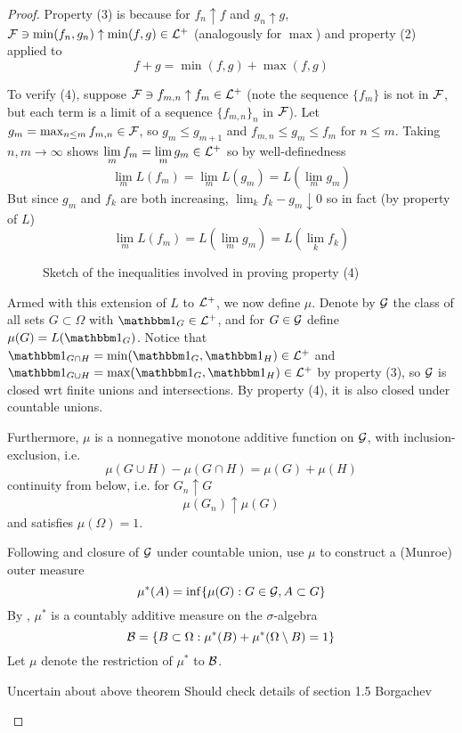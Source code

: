 \begin{proof}
  Property (3) is because for $f_n \uparrow f$ and $g_n \uparrow g$,
  $\mathcal{F} \ni \min(f_n, g_n) \uparrow \min(f,g) \in \mathcal{L}^+$
  (analogously for $\max$)
  and property (2) applied to
  \[
    f+g = \min(f,g) + \max(f,g)
  \]

  To verify (4), suppose $\mathcal{F} \ni f_{m,n} \uparrow f_m \in \mathcal{L}^+$
  (note the sequence $\{f_m\}$ is not in $\mathcal{F}$, but each term is a limit
  of a sequence $\{f_{m,n}\}_n$ in $\mathcal{F}$).
  Let $g_m = \max_{n \leq m} f_{m,n} \in \mathcal{F}$, so
  $g_m \leq g_{m+1}$ and $f_{m,n} \leq g_m \leq f_m$ for $n \leq m$.
  Taking $n,m \to \infty$ shows $\lim_m f_m = \lim_m g_m \in \cL^+$
  so by well-definedness
  \[
    \lim_m L(f_m) = \lim_m L(g_m) = L(\lim_m g_m)
  \]
  But since $g_m$ and $f_k$ are both increasing, $\lim_k f_k - g_m \downarrow
  0$ so in fact (by property of $L$)
  \[
    \lim_m L(f_m) = L(\lim_m g_m) = L(\lim_k f_k)
  \]

  \begin{figure}[H]
    \centering
    \caption{Sketch of the inequalities involved in proving property (4)}
    \label{fig:sketch-of-proof-of-4}
  \end{figure}

  Armed with this extension of $L$ to $\mathcal{L}^+$, we now define $\mu$.
  Denote by $\mathcal{G}$ the class of all sets $G \subset \Omega$ with
  $\ind_{G} \in \cL^+$,
  and for $G \in \mathcal{G}$ define $\mu(G) = L(\ind_{G})$.
  Notice that $\ind_{G \cap H} = \min(\ind_G, \ind_H) \in \cL^+$
  and $\ind_{G \cup H} = \max(\ind_G, \ind_H) \in \cL^+$
  by property (3), so $\mathcal{G}$ is closed wrt finite unions and intersections.
  By property (4), it is also closed under countable unions.

  Furthermore, $\mu$ is a nonnegative monotone additive function on $\mathcal{G}$,
  with inclusion-exclusion, i.e.
  \[
    \mu(G \cup H) - \mu(G \cap H) = \mu(G) + \mu(H)
  \]
  continuity from below, i.e. for $G_n \uparrow G$
  \[
    \mu(G_n) \uparrow \mu(G)
  \]
  and satisfies $\mu(\Omega) = 1$.

  Following  and closure of $\mathcal{G}$
  under countable union, use $\mu$ to construct a (Munroe) outer measure
  \[
    \mu^*(A) = \inf\{\mu(G) : G \in \mathcal{G}, A \subset G\}
  \]
  By ,
  $\mu^*$ is a countably additive measure on the $\sigma$-algebra
  \[
    \mathcal{B} = \{B \subset \Omega: \mu^*(B) + \mu^*(\Omega \setminus B) = 1\}
  \]
  Let $\mu$ denote the restriction of $\mu^*$ to $\mathcal{B}$.
  \begin{note}{Uncertain about above theorem}
    Should check details of section 1.5 Borgachev
  \end{note}


\end{proof}
